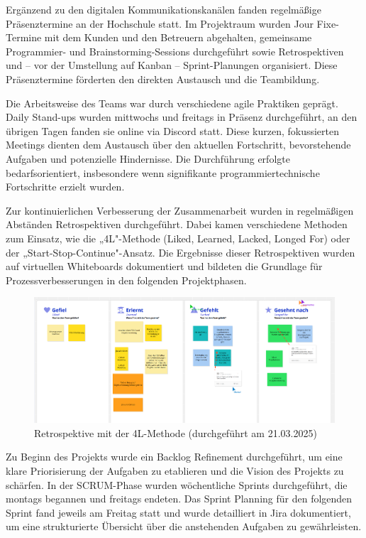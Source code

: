 Ergänzend zu den digitalen Kommunikationskanälen fanden regelmäßige Präsenztermine an der Hochschule statt. Im Projektraum wurden Jour Fixe-Termine mit dem Kunden und den Betreuern abgehalten, gemeinsame Programmier- und Brainstorming-Sessions durchgeführt sowie Retrospektiven und – vor der Umstellung auf Kanban – Sprint-Planungen organisiert. Diese Präsenztermine förderten den direkten Austausch und die Teambildung.

Die Arbeitsweise des Teams war durch verschiedene agile Praktiken geprägt. Daily Stand-ups wurden mittwochs und freitags in Präsenz durchgeführt, an den übrigen Tagen fanden sie online via Discord statt. Diese kurzen, fokussierten Meetings dienten dem Austausch über den aktuellen Fortschritt, bevorstehende Aufgaben und potenzielle Hindernisse. Die Durchführung erfolgte bedarfsorientiert, insbesondere wenn signifikante programmiertechnische Fortschritte erzielt wurden.

Zur kontinuierlichen Verbesserung der Zusammenarbeit wurden in regelmäßigen Abständen Retrospektiven durchgeführt. Dabei kamen verschiedene Methoden zum Einsatz, wie die „4L"-Methode (Liked, Learned, Lacked, Longed For) oder der „Start-Stop-Continue"-Ansatz. Die Ergebnisse dieser Retrospektiven wurden auf virtuellen Whiteboards dokumentiert und bildeten die Grundlage für Prozessverbesserungen in den folgenden Projektphasen.

\begin{figure}[h]
    \centering
    \includegraphics[width=1.0\textwidth]{data/4l.png}
    \caption{Retrospektive mit der 4L-Methode (durchgeführt am 21.03.2025)}
    \label{fig:da}
\end{figure}

Zu Beginn des Projekts wurde ein Backlog Refinement durchgeführt, um eine klare Priorisierung der Aufgaben zu etablieren und die Vision des Projekts zu schärfen. In der SCRUM-Phase wurden wöchentliche Sprints durchgeführt, die montags begannen und freitags endeten. Das Sprint Planning für den folgenden Sprint fand jeweils am Freitag statt und wurde detailliert in Jira dokumentiert, um eine strukturierte Übersicht über die anstehenden Aufgaben zu gewährleisten.

